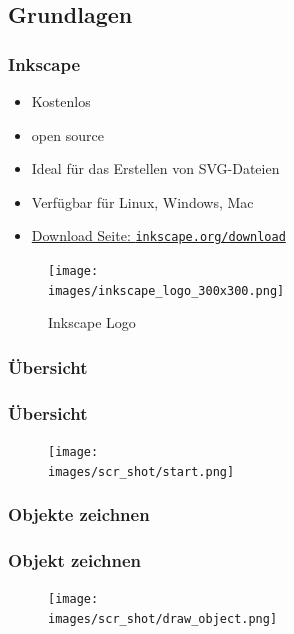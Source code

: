 \documentclass[german]{beamer} %
\newcommand{\images}{vektorzeichnen/}
\begin{document}
\subsection{Grundlagen}
\begin{frame}
  \frametitle{Inkscape}
  
  \begin{itemize}
  	\item Kostenlos
  	\item open source
  	\item Ideal für das Erstellen von SVG-Dateien
  	\item Verfügbar für Linux, Windows, Mac
  	\item \href{https://inkscape.org/download/}{Download Seite: \texttt{inkscape.org/download}}
  \end{itemize}

  \begin{figure}
  	\centering
    \texttt{[image: \\images/inkscape\_logo\_300x300.png]}
    \caption{Inkscape Logo}
    \label{fig:inkscape_logo}
  \end{figure}  
  
 \end{frame}


\subsubsection{Übersicht}
\begin{frame}
  \frametitle{Übersicht}

  \begin{figure}
  	\centering
    \texttt{[image: \\images/scr\_shot/start.png]}
    \label{fig:inkscape_scr_shot_start}
  \end{figure}
  
 \end{frame}

 

\subsubsection{Objekte zeichnen}
\begin{frame}
  \frametitle{Objekt zeichnen}

  \begin{figure}
  	\centering
    \texttt{[image: \\images/scr\_shot/draw\_object.png]}
    \label{fig:inkscape_scr_shot_draw_object}
  \end{figure}
  
 \end{frame}
 
\end{document}
